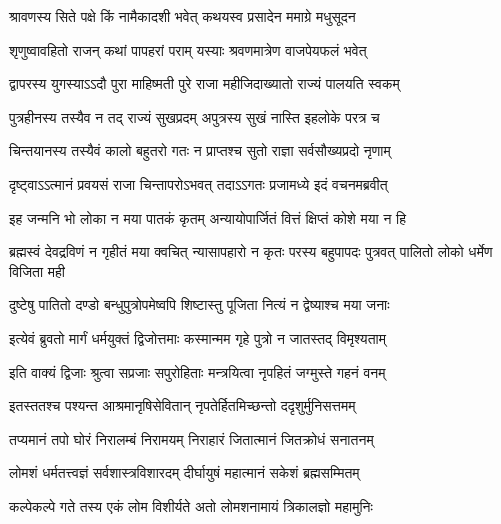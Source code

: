\label{sec:padma-shravana-shukla-putrada}

\ganapatyadiDhyanam
\padmaPuranam



\twolineshloka
{श्रावणस्य सिते पक्षे किं नामैकादशी भवेत्}
{कथयस्व प्रसादेन ममाग्रे मधुसूदन}%


\twolineshloka
{शृणुष्वावहितो राजन् कथां पापहरां पराम्}
{यस्याः श्रवणमात्रेण वाजपेयफलं भवेत्}%

\twolineshloka
{द्वापरस्य युगस्याऽऽदौ पुरा माहिष्मती पुरे}
{राजा महीजिदाख्यातो राज्यं पालयति स्वकम्}%

\twolineshloka
{पुत्रहीनस्य तस्यैव न तद् राज्यं सुखप्रदम्}
{अपुत्रस्य सुखं नास्ति इहलोके परत्र च}%

\twolineshloka
{चिन्तयानस्य तस्यैवं कालो बहुतरो गतः}
{न प्राप्तश्च सुतो राज्ञा सर्वसौख्यप्रदो नृणाम्}%

\twolineshloka
{दृष्ट्वाऽऽत्मानं प्रवयसं राजा चिन्तापरोऽभवत्}
{तदाऽऽगतः प्रजामध्ये इदं वचनमब्रवीत्}%

\twolineshloka
{इह जन्मनि भो लोका न मया पातकं कृतम्}
{अन्यायोपार्जितं वित्तं क्षिप्तं कोशे मया न हि}%

\threelineshloka
{ब्रह्मस्वं देवद्रविणं न गृहीतं मया क्वचित्}
{न्यासापहारो न कृतः परस्य बहुपापदः}
{पुत्रवत् पालितो लोको धर्मेण विजिता मही}%

\twolineshloka
{दुष्टेषु पातितो दण्डो बन्धुपुत्रोपमेष्वपि}
{शिष्टास्तु पूजिता नित्यं न द्वेष्याश्च मया जनाः}%

\twolineshloka
{इत्येवं ब्रुवतो मार्गं धर्मयुक्तं द्विजोत्तमाः}
{कस्मान्मम गृहे पुत्रो न जातस्तद् विमृश्यताम्}%

\twolineshloka
{इति वाक्यं द्विजाः श्रुत्वा सप्रजाः सपुरोहिताः}
{मन्त्रयित्वा नृपहितं जग्मुस्ते गहनं वनम्}%

\twolineshloka
{इतस्ततश्च पश्यन्त आश्रमानृषिसेवितान्}
{नृपतेर्हितमिच्छन्तो ददृशुर्मुनिसत्तमम्}%

\twolineshloka
{तप्यमानं तपो घोरं निरालम्बं निरामयम्}
{निराहारं जितात्मानं जितक्रोधं सनातनम्}%

\twolineshloka
{लोमशं धर्मतत्त्वज्ञं सर्वशास्त्रविशारदम्}
{दीर्घायुषं महात्मानं सकेशं ब्रह्मसम्मितम्}%

\twolineshloka
{कल्पेकल्पे गते तस्य एकं लोम विशीर्यते}
{अतो लोमशनामायं त्रिकालज्ञो महामुनिः}%

